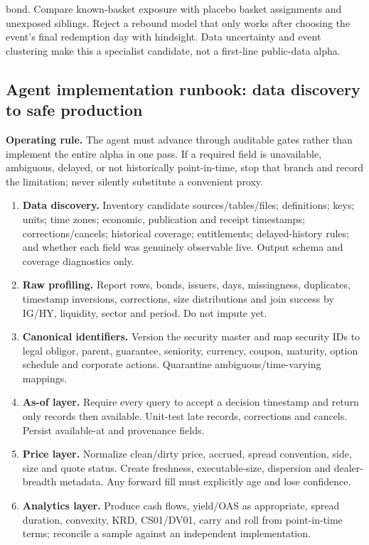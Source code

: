 \documentclass[10pt]{article}
\begin{document}
bond. Compare known-basket exposure with placebo basket assignments and unexposed siblings. Reject a rebound model that only works after choosing the event’s final redemption day with hindsight. Data uncertainty and event clustering make this a specialist candidate, not a first-line public-data alpha.
\subsection{Agent implementation runbook: data discovery to safe production}
\textbf{Operating rule.} The agent must advance through auditable gates rather than implement the entire alpha in one pass. If a required field is unavailable, ambiguous, delayed, or not historically point-in-time, stop that branch and record the limitation; never silently substitute a convenient proxy.
\begin{enumerate}[leftmargin=2em,label=\textbf{A\arabic*.}]
\item \textbf{Data discovery.} Inventory candidate sources/tables/files; definitions; keys; units; time zones; economic, publication and receipt timestamps; corrections/cancels; historical coverage; entitlements; delayed-history rules; and whether each field was genuinely observable live. Output schema and coverage diagnostics only.
\item \textbf{Raw profiling.} Report rows, bonds, issuers, days, missingness, duplicates, timestamp inversions, corrections, size distributions and join success by IG/HY, liquidity, sector and period. Do not impute yet.
\item \textbf{Canonical identifiers.} Version the security master and map security IDs to legal obligor, parent, guarantee, seniority, currency, coupon, maturity, option schedule and corporate actions. Quarantine ambiguous/time-varying mappings.
\item \textbf{As-of layer.} Require every query to accept a decision timestamp and return only records then available. Unit-test late records, corrections and cancels. Persist available-at and provenance fields.
\item \textbf{Price layer.} Normalize clean/dirty price, accrued, spread convention, side, size and quote status. Create freshness, executable-size, dispersion and dealer-breadth metadata. Any forward fill must explicitly age and lose confidence.
\item \textbf{Analytics layer.} Produce cash flows, yield/OAS as appropriate, spread duration, convexity, KRD, CS01/DV01, carry and roll from point-in-time terms; reconcile a sample against an independent implementation.

\end{enumerate}
\end{document}
